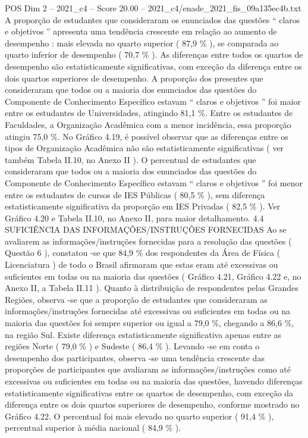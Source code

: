 \begin{textsample}{POS Dim 2 – 2021\_c4 – Score 20.00 – 2021\_c4/enade\_2021\_fis\_09a135ec4b.txt}
A proporção de estudantes que consideraram os enunciados das questões “ claros e objetivos ” apresenta uma tendência crescente em relação ao aumento de desempenho : mais elevada no quarto superior ( 87,9 \% ), se comparada ao quarto inferior de desempenho ( 70,7 \% ).
As diferenças entre todos os quartos de desempenho são estatisticamente significativas, com exceção da diferença entre os dois quartos superiores de desempenho.
A proporção dos presentes que consideraram que todos ou a maioria dos enunciados das questões do Componente de Conhecimento Específico estavam “ claros e objetivos ” foi maior entre os estudantes de Universidades, atingindo 81,1 \%.
Entre os estudantes de Faculdades, a Organização Acadêmica com a menor incidência, essa proporção atingiu 75,0 \%.
No Gráfico 4.19, é possível observar que as diferenças entre os tipos de Organização Acadêmica não são estatisticamente significativas ( ver também Tabela II.10, no Anexo II ).
O percentual de estudantes que consideraram que todos ou a maioria dos enunciados das questões do Componente de Conhecimento Específico estavam “ claros e objetivos ” foi menor entre os estudantes de cursos de IES Públicas ( 80,5 \% ), sem diferença estatisticamente significativa da proporção em IES Privadas ( 82,5 \% ).
Ver Gráfico 4.20 e Tabela II.10, no Anexo II, para maior detalhamento. 4.4 SUFICIÊNCIA DAS INFORMAÇÕES/INSTRUÇÕES FORNECIDAS Ao se avaliarem as informações/instruções fornecidas para a resolução das questões ( Questão 6 ), constatou -se que 84,9 \% dos respondentes da Área de Física ( Licenciatura ) de todo o Brasil afirmaram que estas eram até excessivas ou suficientes em todas ou na maioria das questões ( Gráfico 4.21, Gráfico 4.22 e, no Anexo II, a Tabela II.11 ).
Quanto à distribuição de respondentes pelas Grandes Regiões, observa -se que a proporção de estudantes que consideraram as informações/instruções fornecidas até excessivas ou suficientes em todas ou na maioria das questões foi sempre superior ou igual a 79,0 \%, chegando a 86,6 \%, na região Sul.
Existe diferença estatisticamente significativa apenas entre as regiões Norte ( 79,0 \% ) e Sudeste ( 86,4 \% ).
Levando -se em conta o desempenho dos participantes, observa -se uma tendência crescente das proporções de participantes que avaliaram as informações/instruções como até excessivas ou suficientes em todas ou na maioria das questões, havendo diferenças estatisticamente significativas entre os quartos de desempenho, com exceção da diferença entre os dois quartos superiores de desempenho, conforme mostrado no Gráfico 4.22.
O percentual foi mais elevado no quarto superior ( 91,4 \% ), percentual superior à média nacional ( 84,9 \% ).

\end{textsample}
